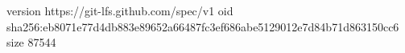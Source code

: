 version https://git-lfs.github.com/spec/v1
oid sha256:eb8071e77d4db883e89652a66487fc3ef686abe5129012e7d84b71d863150cc6
size 87544
